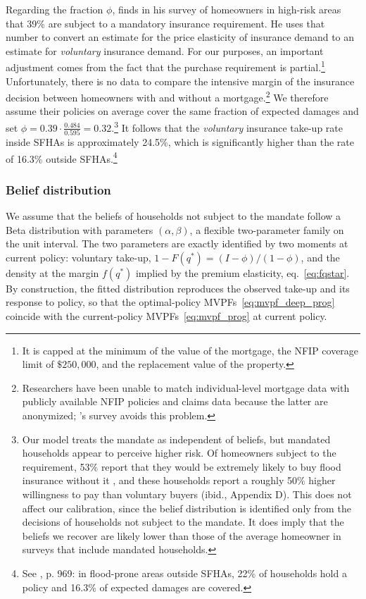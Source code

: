 \documentclass[12pt]{article}
\begin{document}
Regarding the fraction $\phi$, \cite{mulder2024mismeasuring} finds in his survey of homeowners in high-risk areas that 39\% are subject to a mandatory insurance requirement. He uses that number to convert an estimate for the price elasticity of insurance demand to an estimate for \textit{voluntary} insurance demand. For our purposes, an important adjustment comes from the fact that the purchase requirement is partial.\footnote{It is capped at the minimum of the value of the mortgage, the NFIP coverage limit of $\$250,000$, and the replacement value of the property.} Unfortunately, there is no data to compare the intensive margin of the insurance decision between homeowners with and without a mortgage.\footnote{Researchers have been unable to match individual-level mortgage data with publicly available NFIP policies and claims data because the latter are anonymized; \cite{mulder2024mismeasuring}'s survey avoids this problem.} We therefore assume their policies on average cover the same fraction of expected damages and set $\phi=0.39\cdot\frac{0.484}{0.595}=0.32$.\footnote{Our model treats the mandate as independent of beliefs, but mandated households appear to perceive higher risk. Of homeowners subject to the requirement, 53$\%$ report that they would be extremely likely to buy flood insurance without it \citep[p.~16]{mulder2024mismeasuring}, and these households report a roughly 50$\%$ higher willingness to pay than voluntary buyers (ibid., Appendix D). This does not affect our calibration, since the belief distribution is identified only from the decisions of households not subject to the mandate. It does imply that the beliefs we recover are likely lower than those of the average homeowner in surveys that include mandated households.} It follows that the \textit{voluntary} insurance take-up rate inside SFHAs is approximately 24.5\%, which is significantly higher than the rate of 16.3\% outside SFHAs.\footnote{See \cite{amornsiripanitch2025measuring}, p. 969: in flood-prone areas outside SFHAs, 22\% of households hold a policy and 16.3\% of expected damages are covered.}

\subsubsection{Belief distribution}

We assume that the beliefs of households not subject to the mandate follow a Beta distribution with parameters $(\alpha,\beta)$, a flexible two-parameter family on the unit interval. The two parameters are exactly identified by two moments at current policy: voluntary take-up, $1-F(q^*)=(I-\phi)/(1-\phi)$, and the density at the margin $f(q^*)$ implied by the premium elasticity, eq.~\eqref{eq:fqstar}. By construction, the fitted distribution reproduces the observed take-up and its response to policy, so that the optimal-policy MVPFs~\eqref{eq:mvpf_deep_prog} coincide with the current-policy MVPFs~\eqref{eq:mvpf_prog} at current policy.
\end{document}
